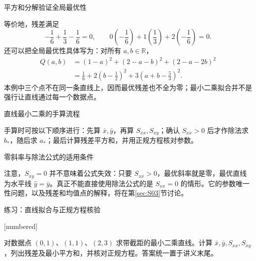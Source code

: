\documentclass[aspectratio=169,10pt,fontset=fandol]{ctexbeamer}
\makeatletter
\newcommand{\mathagentexerciselabelcontext}[1]{%
\hypertarget<1>{#1}{}%
\edef\@currentHref{#1}%
}
\makeatother
\begin{document}
\begin{frame}[t,fragile]{平方和分解验证全局最优性}
\footnotesize
{\footnotesize
等价地，残差满足
\[
-\frac16+\frac13-\frac16=0,\qquad
0\left(-\frac16\right)+1\left(\frac13\right)+2\left(-\frac16\right)=0.
\]
还可以把全局最优性具体写为：对所有 $a,b\in\mathbb{R}$，
\[
\begin{aligned}
Q(a,b)&=(1-a)^2+(2-a-b)^2+(2-a-2b)^2\\
&=\frac16+2\left(b-\frac12\right)^2+3\left(a+b-\frac53\right)^2.
\end{aligned}
\]
本例中三个点不在同一条直线上，因而最优残差也不全为零；最小二乘拟合并不是强行让直线通过每一个数据点。\par

}
\end{frame}
\begin{frame}[t,fragile]{直线最小二乘的手算流程}
\footnotesize
{\footnotesize
手算时可按以下顺序进行：先算 $\bar{x},\bar{y}$，再算 $S_{xx},S_{xy}$；确认 $S_{xx}>0$ 后才作除法求 $b_*$，随后求 $a_*$；最后计算残差平方和，并用正规方程核对参数。


}
\end{frame}
\begin{frame}[t,fragile]{零斜率与除法公式的适用条件}
\footnotesize
{\footnotesize
注意，$S_{xy}=0$ 并不意味着公式失效：只要 $S_{xx}>0$，最优斜率就是零，最优直线为水平线 $\hat{y}=\bar{y}$。真正不能直接使用除法公式的是 $S_{xx}=0$ 的情形。它的参数唯一性问题，以及残差和均值点的解释，将在第\ref{sec:S03}节讨论。\par

}
\end{frame}
\begin{frame}[t,fragile]{练习：直线拟合与正规方程核验}
\normalsize
{\normalsize
[numbered]
\mathagentexerciselabelcontext{mathagent.exercise.U0028.0}
\begin{exercise}
\label{mathagent:exercise:332ae2e99c79cf97370ba4732967ff23f2a2c4a4b36b98eda8e910755bf43b8b}
对数据点 $(0,1)$、$(1,1)$、$(2,3)$ 求带截距的最小二乘直线。计算 $\bar{x},\bar{y},S_{xx},S_{xy}$，列出残差及最小平方和，并核对正规方程。答案统一置于讲义末尾。
\end{exercise}
}
\end{frame}
\end{document}
